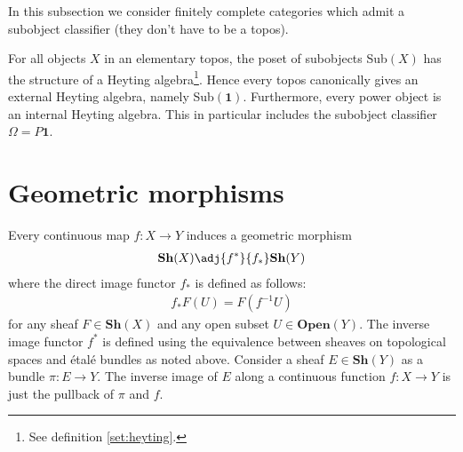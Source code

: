     In this subsection we consider finitely complete categories which admit a subobject classifier (they don't have to be a topos).


    \begin{property}
        For all objects $X$ in an elementary topos, the poset of subobjects Sub$(X)$ has the structure of a Heyting algebra\footnote{See definition \ref{set:heyting}.}. Hence every topos canonically gives an external Heyting algebra, namely Sub$(\mathbf{1})$. Furthermore, every power object is an internal Heyting algebra. This in particular includes the subobject classifier $\Omega=P{\mathbf{1}}$.
    \end{property}

\section{Geometric morphisms}



    \begin{example}
        Every continuous map $f:X\rightarrow Y$ induces a geometric morphism
        \begin{gather}
            \mathbf{Sh}(X)\adj{f^*}{f_*}\mathbf{Sh}(Y)
        \end{gather}
        where the direct image functor $f_*$ is defined as follows:
        \begin{gather}
            f_*F(U) = F(f^{-1}U)
        \end{gather}
        for any sheaf $F\in\mathbf{Sh}(X)$ and any open subset $U\in\mathbf{Open}(Y)$. The inverse image functor $f^*$ is defined using the equivalence between sheaves on topological spaces and \'etal\'e bundles as noted above. Consider a sheaf $E\in\mathbf{Sh}(Y)$ as a bundle $\pi:E\rightarrow Y$. The inverse image of $E$ along a continuous function $f:X\rightarrow Y$ is just the pullback of $\pi$ and $f$.
    \end{example}


